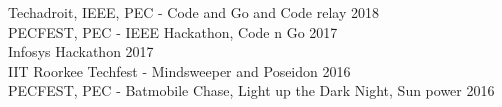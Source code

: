 \linespread{1.1}
\small Techadroit, IEEE, PEC - Code and Go and Code relay\hfill%
\footnotesize{2018}
\\
\small PECFEST, PEC - IEEE Hackathon, Code n Go \hfill%
\footnotesize{2017}
\\
\small Infosys Hackathon\hfill%
\footnotesize{2017}
\\
\small IIT Roorkee Techfest - Mindsweeper and Poseidon \hfill%
\footnotesize{2016}
\\
\small PECFEST, PEC - Batmobile Chase, Light up the Dark Night, Sun power \hfill%
\footnotesize{2016}
\\